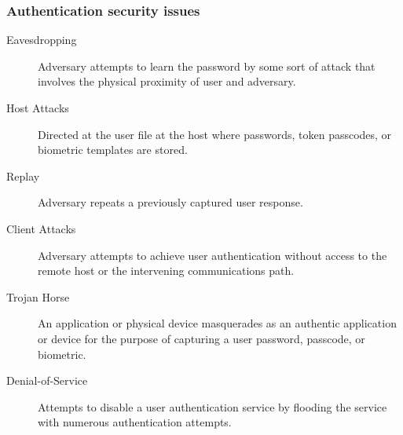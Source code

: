 \documentclass{article}
\begin{document}
        \subsubsection{Authentication security issues}
        \begin{description}
            \item[Eavesdropping] 
            Adversary attempts to learn the password by some sort of attack that involves the physical proximity of user and adversary.
        
            \item[Host Attacks] 
            Directed at the user file at the host where passwords, token passcodes, or biometric templates are stored.
        
            \item[Replay] 
            Adversary repeats a previously captured user response.
        
            \item[Client Attacks] 
            Adversary attempts to achieve user authentication without access to the remote host or the intervening communications path.
        
            \item[Trojan Horse] 
            An application or physical device masquerades as an authentic application or device for the purpose of capturing a user password, passcode, or biometric.
        
            \item[Denial-of-Service] 
            Attempts to disable a user authentication service by flooding the service with numerous authentication attempts.
        \end{description}
        
\end{document}
